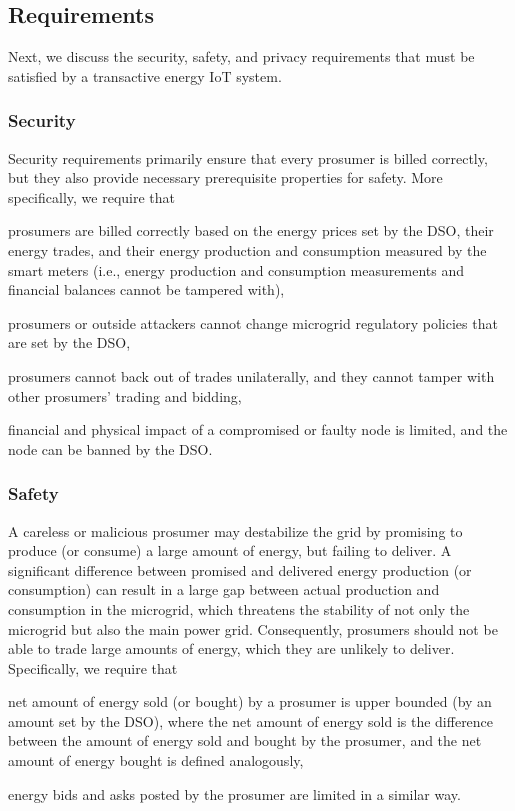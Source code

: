 \subsection{Requirements}
Next, we discuss the security, safety, and privacy requirements that must be satisfied by a transactive energy IoT system.

\subsubsection{Security}
Security requirements primarily ensure that every prosumer is billed correctly, but they also provide necessary prerequisite properties for safety.
More specifically, we require that 
\begin{compactitem}
\item prosumers are billed correctly based on the energy prices set by the DSO, their energy trades, and their energy production and consumption measured by the smart meters (i.e., energy production and consumption measurements and financial balances cannot be tampered with),
\item prosumers or outside attackers cannot change microgrid regulatory policies that are set by the DSO,
\item prosumers cannot back out of trades unilaterally, and they cannot tamper with other prosumers' trading and bidding,
\item financial and physical impact of a compromised or faulty node is limited, and the node can be banned by the DSO.
\end{compactitem}

\subsubsection{Safety}
A careless or malicious prosumer may destabilize the grid by promising to produce (or consume) a large amount of energy, but failing to deliver.
A significant difference between promised and delivered energy production (or consumption) can result in a large gap between actual production and consumption in the microgrid, which threatens the stability of not only the microgrid but also the main power grid.
Consequently, prosumers should not be able to trade large amounts of energy, which they are unlikely to deliver.
Specifically, we require that
\begin{compactitem}
\item net amount of energy sold (or bought) by a prosumer is upper bounded (by an amount set by the DSO), where the net amount of energy sold is the difference between the amount of energy sold and bought by the prosumer, and the net amount of energy bought is defined analogously,
\item energy bids and asks posted by the prosumer are limited in a similar way.
\end{compactitem}

